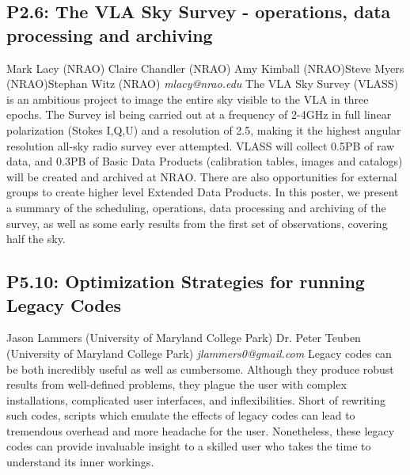 \documentclass{report}
\begin{document}
\subsection*{P2.6: The VLA Sky Survey - operations, data processing and archiving}
\bigskip
Mark Lacy (NRAO) \newline Claire Chandler (NRAO) \newline  Amy Kimball (NRAO)\newline  Steve Myers (NRAO)\newline Stephan Witz (NRAO)\newline  \newline\newline
{\it mlacy@nrao.edu}\newline
\newline\newline
The VLA Sky Survey (VLASS) is an ambitious project to image the entire sky visible to the VLA in three epochs. The Survey isl being carried out at a frequency of 2-4GHz in full linear polarization (Stokes I,Q,U) and a resolution of 2.5, making it the highest angular resolution all-sky radio survey ever attempted.  VLASS will collect 0.5PB of raw data, and 0.3PB of Basic Data Products (calibration tables, images and catalogs) will be created and archived at NRAO. There are also opportunities for external groups to create higher level Extended Data Products. In this poster, we present a summary of the scheduling, operations, data processing and archiving of the survey, as well as some early results from the first set of observations, covering half the sky.\newline
\newpage
\subsection*{P5.10: Optimization Strategies for running Legacy Codes}
\bigskip
Jason Lammers (University of Maryland College Park) \newline Dr. Peter Teuben (University of Maryland College Park) \newline   \newline   \newline  \newline  \newline\newline
{\it jlammers0@gmail.com}\newline
\newline\newline
Legacy codes can be both incredibly useful as well as cumbersome.  Although they produce robust results from well-defined problems, they plague the user with complex installations, complicated user interfaces, and inflexibilities.  Short of rewriting such codes, scripts which emulate the effects of legacy codes can lead to tremendous overhead and more headache for the user.  Nonetheless, these legacy codes can provide invaluable insight to a skilled user who takes the time to understand its inner workings.
\end{document}
